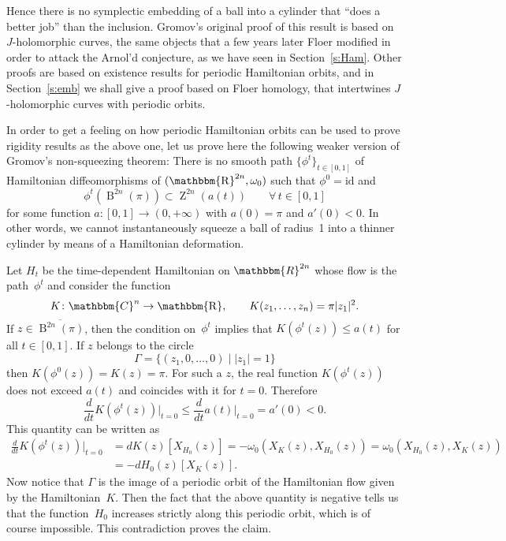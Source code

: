\documentclass[12pt,twoside]{amsart}
\theoremstyle{plain}
\numberwithin{figure}{section}
\numberwithin{equation}{section}
\def\B{\operatorname{B}}
\def\Z{\operatorname{Z}}
\def\CC{\mathbbm{C}}
\def\RR{\mathbbm{R}}
\def\R{\operatorname{\mathbbm{R}}}
\begin{document}
Hence there is no symplectic embedding of a ball into a cylinder that ``does a better job'' than the inclusion.
%
Gromov's original proof of this result is based on $J$-holomorphic curves, the same objects that 
a few years later Floer modified in order to attack the Arnol'd conjecture, 
as we have seen in Section~\ref{s:Ham}. 
Other proofs are based on existence results for periodic Hamiltonian orbits, 
and in Section~\ref{s:emb} we shall give a proof based on Floer homology, 
that intertwines $J$-holomorphic curves with periodic orbits.

In order to get a feeling on how periodic Hamiltonian orbits can be used to prove rigidity results 
as the above one, let us prove here the following weaker version of Gromov's non-squeezing theorem: 
There is no smooth path $\{\phi^t\}_{t\in [0,1]}$ of Hamiltonian diffeomorphisms of $(\R^{2n},\omega_0)$ 
such that $\phi^0 = \mathrm{id}$ and
\[
\phi^t(\B^{2n} (\pi)) \subset \Z^{2n} (a(t)) \qquad \forall \,t\in [0,1]
\]
for some function $a \colon [0,1] \rightarrow (0,+\infty)$ with $a(0)=\pi$ and $a'(0)<0$. 
In other words, we cannot instantaneously squeeze a ball of radius~1 into a thinner cylinder 
by means of a Hamiltonian deformation.

Let $H_t$ be the time-dependent Hamiltonian on $\RR^{2n}$ whose flow is the path~$\phi^t$ 
and consider the function
\[
K \colon \CC^{n} \rightarrow \R, \qquad K(z_1,\dots,z_n) = \pi |z_1|^2.
\] 
If $z \in \overline{\B^{2n}(\pi)}$, then the condition on~$\phi^t$ implies that 
$K(\phi^t(z)) \leqslant a(t)$ for all $t \in [0,1]$. If $z$ belongs to the circle 
\[
\Gamma = \{ (z_1,0,\dots,0) \mid |z_1|=1 \}
\]
then $K(\phi^0(z)) = K(z) = \pi$. For such a $z$, the real function $K(\phi^t(z))$ does not exceed 
$a(t)$ and coincides with it for $t=0$. Therefore
\[
\frac{d}{dt} K(\phi^t(z)) \Big|_{t=0} \leqslant \frac{d}{dt} a(t) \Big|_{t=0} = a'(0) < 0.
\]
This quantity can be written as 
\[
\begin{split}
\frac{d}{dt} K(\phi^t(z)) \Big|_{t=0} &= dK(z)[X_{H_0}(z)] = 
-\omega_0(X_K(z), X_{H_0}(z)) = \omega_0(X_{H_0}(z), X_K(z)) \\ 
&= -dH_0(z)[X_K(z)] .
\end{split}
\]
Now notice that $\Gamma$ is the image of a periodic orbit of the Hamiltonian flow given by 
the Hamiltonian~$K$. 
Then the fact that the above quantity is negative tells us that the function~$H_0$ increases strictly 
along this periodic orbit, which is of course impossible. This contradiction proves the claim.
\end{document}
